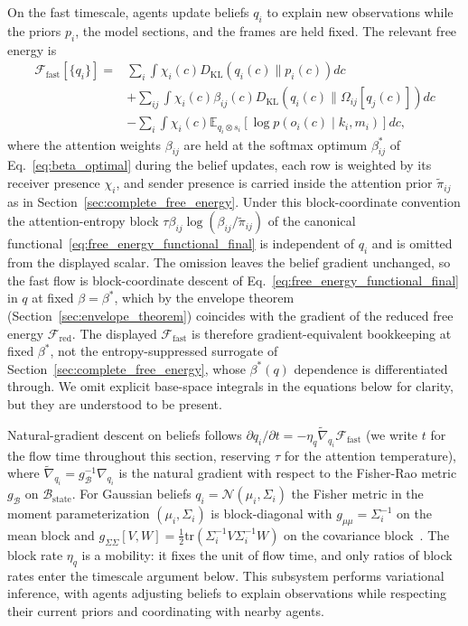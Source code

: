 On the fast timescale, agents update beliefs $q_i$ to explain new observations while the priors $p_i$, the model sections, and the frames are held fixed. The relevant free energy is
\begin{align}
\mathcal{F}_{\text{fast}}[\{q_i\}] = {}& \sum_i \int \chi_i(c)  D_{\mathrm{KL}}(q_i(c) \| p_i(c))  dc \nonumber\\
&+ \sum_{ij} \int \chi_i(c)\beta_{ij}(c)  D_{\mathrm{KL}}(q_i(c) \| \Omega_{ij}[q_j(c)])  dc \nonumber\\
&- \sum_i \int \chi_i(c)  \mathbb{E}_{q_i\otimes s_i}[\log p(o_i(c) \mid k_i, m_i)]  dc,
\end{align}
where the attention weights $\beta_{ij}$ are held at the softmax optimum $\beta^*_{ij}$ of Eq.~\eqref{eq:beta_optimal} during the belief updates, each row is weighted by its receiver presence $\chi_i$, and sender presence is carried inside the attention prior $\tilde{\pi}_{ij}$ as in Section~\ref{sec:complete_free_energy}. Under this block-coordinate convention the attention-entropy block $\tau\beta_{ij}\log(\beta_{ij}/\tilde{\pi}_{ij})$ of the canonical functional~\eqref{eq:free_energy_functional_final} is independent of $q_i$ and is omitted from the displayed scalar. The omission leaves the belief gradient unchanged, so the fast flow is block-coordinate descent of Eq.~\eqref{eq:free_energy_functional_final} in $q$ at fixed $\beta = \beta^*$, which by the envelope theorem (Section~\ref{sec:envelope_theorem}) coincides with the gradient of the reduced free energy $\mathcal{F}_{\mathrm{red}}$. The displayed $\mathcal{F}_{\text{fast}}$ is therefore gradient-equivalent bookkeeping at fixed $\beta^*$, not the entropy-suppressed surrogate of Section~\ref{sec:complete_free_energy}, whose $\beta^*(q)$ dependence is differentiated through. We omit explicit base-space integrals in the equations below for clarity, but they are understood to be present.

Natural-gradient descent on beliefs follows $\partial q_i/\partial t = -\eta_q  \tilde{\nabla}_{q_i} \mathcal{F}_{\text{fast}}$ (we write $t$ for the flow time throughout this section, reserving $\tau$ for the attention temperature), where $\tilde{\nabla}_{q_i} = g_{\mathcal{B}}^{-1} \nabla_{q_i}$ is the natural gradient with respect to the Fisher-Rao metric $g_{\mathcal{B}}$ on $\mathcal{B}_{\mathrm{state}}$. For Gaussian beliefs $q_i = \mathcal{N}(\mu_i, \Sigma_i)$ the Fisher metric in the moment parameterization $(\mu_i, \Sigma_i)$ is block-diagonal with $g_{\mu\mu} = \Sigma_i^{-1}$ on the mean block and $g_{\Sigma\Sigma}[V, W] = \tfrac{1}{2}\mathrm{tr}(\Sigma_i^{-1} V \Sigma_i^{-1} W)$ on the covariance block~\cite{Amari2016}. The block rate $\eta_q$ is a mobility: it fixes the unit of flow time, and only ratios of block rates enter the timescale argument below. This subsystem performs variational inference, with agents adjusting beliefs to explain observations while respecting their current priors and coordinating with nearby agents.


